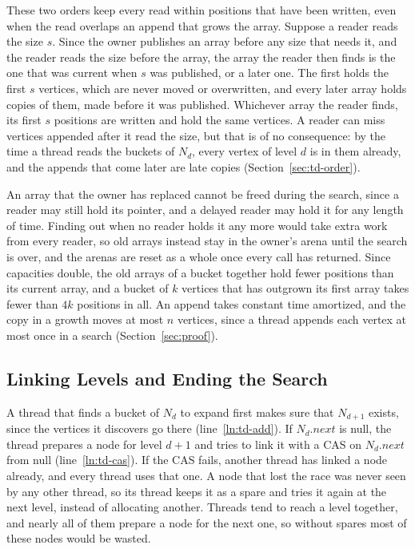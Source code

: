 These two orders keep every read within positions that have been written, even when the read overlaps an append that grows the array. Suppose a reader reads the size $s$. Since the owner publishes an array before any size that needs it, and the reader reads the size before the array, the array the reader then finds is the one that was current when $s$ was published, or a later one. The first holds the first $s$ vertices, which are never moved or overwritten, and every later array holds copies of them, made before it was published. Whichever array the reader finds, its first $s$ positions are written and hold the same vertices. A reader can miss vertices appended after it read the size, but that is of no consequence: by the time a thread reads the buckets of $N_d$, every vertex of level $d$ is in them already, and the appends that come later are late copies (Section~\ref{sec:td-order}).

An array that the owner has replaced cannot be freed during the search, since a reader may still hold its pointer, and a delayed reader may hold it for any length of time. Finding out when no reader holds it any more would take extra work from every reader, so old arrays instead stay in the owner's arena until the search is over, and the arenas are reset as a whole once every call has returned. Since capacities double, the old arrays of a bucket together hold fewer positions than its current array, and a bucket of $k$ vertices that has outgrown its first array takes fewer than $4k$ positions in all. An append takes constant time amortized, and the copy in a growth moves at most $n$ vertices, since a thread appends each vertex at most once in a search (Section~\ref{sec:proof}).

\subsection{Linking Levels and Ending the Search}
\label{sec:td-link}

A thread that finds a bucket of $N_d$ to expand first makes sure that $N_{d+1}$ exists, since the vertices it discovers go there (line~\ref{ln:td-add}). If $N_d.\mathit{next}$ is null, the thread prepares a node for level $d+1$ and tries to link it with a CAS on $N_d.\mathit{next}$ from null (line~\ref{ln:td-cas}). If the CAS fails, another thread has linked a node already, and every thread uses that one. A node that lost the race was never seen by any other thread, so its thread keeps it as a spare and tries it again at the next level, instead of allocating another. Threads tend to reach a level together, and nearly all of them prepare a node for the next one, so without spares most of these nodes would be wasted.

